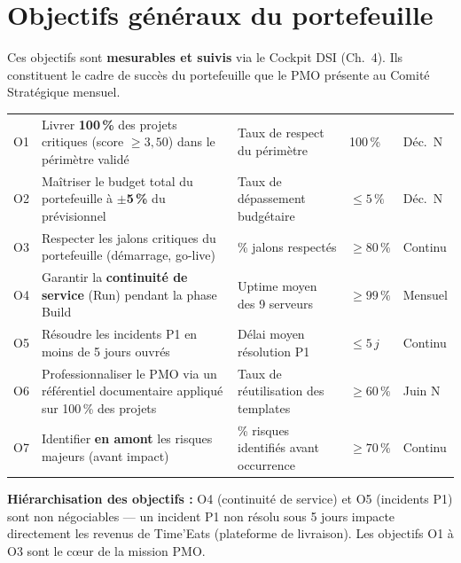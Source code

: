 \documentclass[11pt,a4paper,oneside]{report}
\begin{document}
\section{Objectifs généraux du portefeuille}

Ces objectifs sont \textbf{mesurables et suivis} via le Cockpit DSI (Ch.\ 4). Ils constituent le cadre de succès du portefeuille que le PMO présente au Comité Stratégique mensuel.

\vspace{4pt}
\begin{center}
\renewcommand{\arraystretch}{1.6}
\begin{tabularx}{\textwidth}{C{0.4cm} L{5.5cm} C{2.5cm} C{2.5cm} L{2.5cm}}
\toprule
{}
\th{\#} &  &  &  &  \\
\midrule
O1 & Livrer \textbf{100\,\%} des projets critiques (score $\geq 3{,}50$) dans le périmètre validé & Taux de respect du périmètre & 100\,\% & Déc.\ N \\
O2 & Maîtriser le budget total du portefeuille à \textbf{$\pm$5\,\%} du prévisionnel & Taux de dépassement budgétaire & $\leq 5\,\%$ & Déc.\ N \\
O3 & Respecter les jalons critiques du portefeuille (démarrage, go-live) & \% jalons respectés & $\geq 80\,\%$ & Continu \\
O4 & Garantir la \textbf{continuité de service} (Run) pendant la phase Build & Uptime moyen des 9 serveurs & $\geq 99\,\%$ & Mensuel \\
O5 & Résoudre les incidents P1 en moins de 5 jours ouvrés & Délai moyen résolution P1 & $\leq 5\,j$ & Continu \\
O6 & Professionnaliser le PMO via un référentiel documentaire appliqué sur 100\,\% des projets & Taux de réutilisation des templates & $\geq 60\,\%$ & Juin N \\
O7 & Identifier \textbf{en amont} les risques majeurs (avant impact) & \% risques identifiés avant occurrence & $\geq 70\,\%$ & Continu \\
\bottomrule
\end{tabularx}
\end{center}

\begin{alert}
\textbf{Hiérarchisation des objectifs :} O4 (continuité de service) et O5 (incidents P1) sont non négociables --- un incident P1 non résolu sous 5 jours impacte directement les revenus de Time'Eats (plateforme de livraison). Les objectifs O1 à O3 sont le cœur de la mission PMO.
\end{alert}
\end{document}
